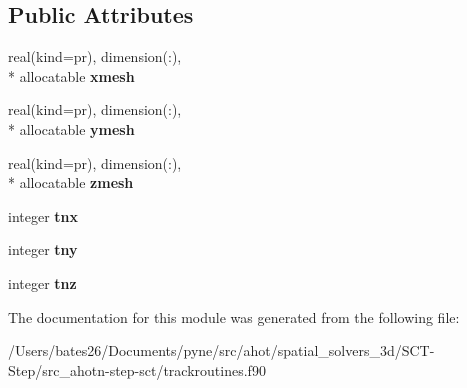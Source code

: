 \subsection*{Public Attributes}
\begin{DoxyCompactItemize}
\item 
\hypertarget{classtracking__routines_a07524d1ef073199189df2a7f7f3fa5ec}{real(kind=pr), dimension(\+:), \\*
allocatable {\bfseries xmesh}}\label{classtracking__routines_a07524d1ef073199189df2a7f7f3fa5ec}

\item 
\hypertarget{classtracking__routines_aa5a1a25601052aa53c95a49839c7caa6}{real(kind=pr), dimension(\+:), \\*
allocatable {\bfseries ymesh}}\label{classtracking__routines_aa5a1a25601052aa53c95a49839c7caa6}

\item 
\hypertarget{classtracking__routines_ad21d114b4233969bbe2985552ff3ddd3}{real(kind=pr), dimension(\+:), \\*
allocatable {\bfseries zmesh}}\label{classtracking__routines_ad21d114b4233969bbe2985552ff3ddd3}

\item 
\hypertarget{classtracking__routines_acbc37a14a1ab16ecf181d9cbc037072d}{integer {\bfseries tnx}}\label{classtracking__routines_acbc37a14a1ab16ecf181d9cbc037072d}

\item 
\hypertarget{classtracking__routines_a1db31d3726c30cc34544ceadeb7dc3d4}{integer {\bfseries tny}}\label{classtracking__routines_a1db31d3726c30cc34544ceadeb7dc3d4}

\item 
\hypertarget{classtracking__routines_a22f4df48f39b50f5ceab6c0c4a076555}{integer {\bfseries tnz}}\label{classtracking__routines_a22f4df48f39b50f5ceab6c0c4a076555}

\end{DoxyCompactItemize}


The documentation for this module was generated from the following file\+:\begin{DoxyCompactItemize}
\item 
/\+Users/bates26/\+Documents/pyne/src/ahot/spatial\+\_\+solvers\+\_\+3d/\+S\+C\+T-\/\+Step/src\+\_\+ahotn-\/step-\/sct/trackroutines.\+f90\end{DoxyCompactItemize}
